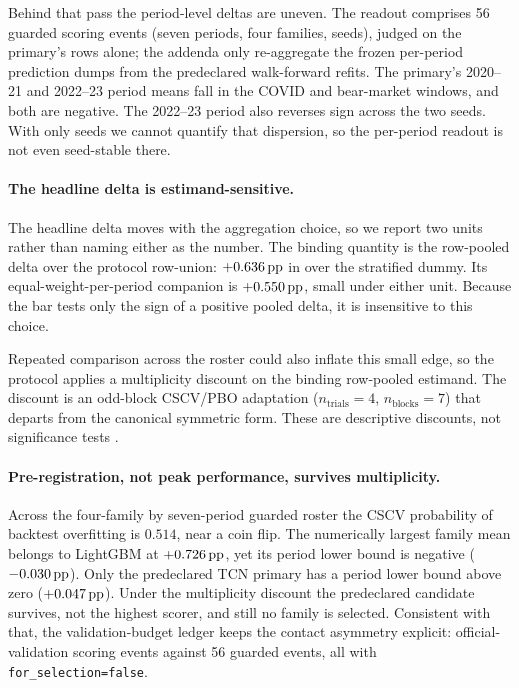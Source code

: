 Behind that pass the period-level deltas are uneven. The readout comprises 56 guarded
scoring events (seven periods, four families, \numseeds{} seeds), judged on the
primary's rows alone; the addenda only re-aggregate the frozen per-period prediction
dumps from the predeclared walk-forward refits. The primary's 2020--21 and 2022--23 period
means fall in the COVID and bear-market windows, and both are negative. The 2022--23
period also reverses sign across the two seeds. With only \numseeds{} seeds we cannot
quantify that dispersion, so the per-period readout is not even seed-stable there.

\paragraph{The headline delta is estimand-sensitive.}
The headline delta moves with the aggregation choice, so we report two units rather
than naming either as the number. The binding quantity is the row-pooled delta over
the protocol row-union: $+0.636\,\textrm{pp}{}$ in \macrofone{} over the stratified dummy. Its
equal-weight-per-period companion is $+0.550\,\textrm{pp}{}$, small under either unit. Because
the bar tests only the sign of a positive pooled delta, it is insensitive to this choice.

Repeated comparison across the roster could also inflate this small edge, so the
protocol applies a multiplicity discount on the binding row-pooled estimand. The discount is an
odd-block CSCV/PBO adaptation ($n_{\text{trials}}{=}4$, $n_{\text{blocks}}{=}7$) that
departs from the canonical symmetric form. These are descriptive discounts, not significance tests
\cite{bailey2014pseudo,bailey2016probability,harvey2016cross}.

\paragraph{Pre-registration, not peak performance, survives multiplicity.}
Across the four-family by seven-period guarded roster the CSCV probability of backtest
overfitting is $0.514$, near a coin flip. The numerically largest family mean belongs to
LightGBM at $+0.726\,\textrm{pp}{}$, yet its period lower bound is negative ($-0.030\,\textrm{pp}{}$). Only
the predeclared TCN primary has a period lower bound above zero ($+0.047\,\textrm{pp}{}$). Under
the multiplicity discount the predeclared candidate survives, not the highest scorer,
and still no family is selected. Consistent with that, the validation-budget
ledger keeps the contact asymmetry explicit: \numseeds{} official-validation scoring
events against 56 guarded events, all with \texttt{for\_selection=false}.

